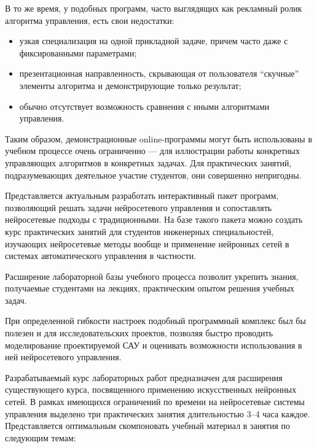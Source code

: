 В то же время, у подобных программ, часто выглядящих как рекламный
ролик алгоритма управления, есть свои недостатки:
\begin{itemize}

\item узкая специализация на одной прикладной задаче, причем часто
  даже с фиксированными параметрами;

\item презентационная направленность, скрывающая от пользователя
  ``скучные'' элементы алгоритма и демонстрирующие только результат;

\item обычно отсутствует возможность сравнения с иными алгоритмами
  управления.

\end{itemize}

Таким образом, демонстрационные online-программы могут быть
использованы в учебном процессе очень ограниченно --- для иллюстрации
работы конкретных управляющих алгоритмов в конкретных задачах.  Для
практических занятий, подразумевающих деятельное участие студентов,
они совершенно непригодны.

Представляется актуальным разработать интерактивный пакет программ,
позволяющий решать задачи нейросетевого управления и сопоставлять
нейросетевые подходы с традиционными.  На базе такого пакета можно
создать курс практических занятий для студентов инженерных
специальностей, изучающих нейросетевые методы вообще и применение
нейронных сетей в системах автоматического управления в частности.

Расширение лабораторной базы учебного процесса позволит укрепить
знания, получаемые студентами на лекциях, практическим опытом решения
учебных задач.  

При определенной гибкости настроек подобный программный комплекс был
бы полезен и для исследовательских проектов, позволяя быстро проводить
моделирование проектируемой САУ и оценивать возможности использования
в ней нейросетевого управления.


Разрабатываемый курс лабораторных работ предназначен для расширения
существующего курса, посвященного применению искусственных нейронных
сетей.  В рамках имеющихся ограничений по времени на нейросетевые
системы управления выделено три практических занятия длительностью
3--4 часа каждое.  Представляется оптимальным скомпоновать учебный
материал в занятия по следующим темам:

